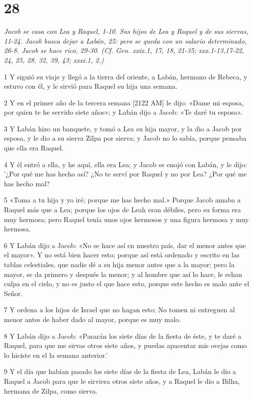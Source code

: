 \chapter{28}

\par \textit{Jacob se casa con Lea y Raquel, 1-10. Sus hijos de Lea y Raquel y de sus siervas, 11-24. Jacob busca dejar a Labán, 25: pero se queda con un salario determinado, 26-8. Jacob se hace rico, 29-30. (Cf. Gen. xxix.1, 17, 18, 21-35; xxx.1-13,17-22, 24, 25, 28, 32, 39, 43; xxxi.1, 2.)}

\par 1 Y siguió su viaje y llegó a la tierra del oriente, a Labán, hermano de Rebeca, y estuvo con él, y le sirvió para Raquel su hija una semana.
\par 2 Y en el primer año de la tercera semana [2122 AM] le dijo: «Dame mi esposa, por quien te he servido siete años»; y Labán dijo a Jacob: «Te daré tu esposa».
\par 3 Y Labán hizo un banquete, y tomó a Lea su hija mayor, y la dio a Jacob por esposa, y le dio a su sierva Zilpa por sierva; y Jacob no lo sabía, porque pensaba que ella era Raquel.
\par 4 Y él entró a ella, y he aquí, ella era Lea; y Jacob se enojó con Labán, y le dijo: '¿Por qué me has hecho así? ¿No te serví por Raquel y no por Lea? ¿Por qué me has hecho mal?
\par 5 «Toma a tu hija y yo iré; porque me has hecho mal.» Porque Jacob amaba a Raquel más que a Lea; porque los ojos de Leah eran débiles, pero su forma era muy hermosa; pero Raquel tenía unos ojos hermosos y una figura hermosa y muy hermosa.
\par 6 Y Labán dijo a Jacob: «No se hace así en nuestro país, dar el menor antes que el mayor». Y no está bien hacer esto; porque así está ordenado y escrito en las tablas celestiales, que nadie dé a su hija menor antes que a la mayor; pero la mayor, se da primero y después la menor; y al hombre que así lo hace, le echan culpa en el cielo, y no es justo el que hace esto, porque este hecho es malo ante el Señor.
\par 7 Y ordena a los hijos de Israel que no hagan esto; No tomen ni entreguen al menor antes de haber dado al mayor, porque es muy malo.
\par 8 Y Labán dijo a Jacob: «Pasarán los siete días de la fiesta de éste, y te daré a Raquel, para que me sirvas otros siete años, y puedas apacentar mis ovejas como lo hiciste en el la semana anterior.'
\par 9 Y el día que habían pasado los siete días de la fiesta de Lea, Labán le dio a Raquel a Jacob para que le sirviera otros siete años, y a Raquel le dio a Bilha, hermana de Zilpa, como sierva.
